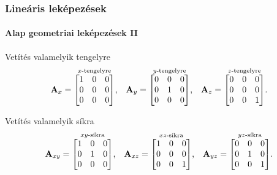\begin{frame}
  \frametitle{Lineáris leképezések}
  \framesubtitle{Alap geometriai leképezések II}

  \begin{block}{Vetítés valamelyik tengelyre}
    \[
      \mathbf{A}_x = \overset{x\text{-tengelyre}}{\begin{bmatrix}
          1 & 0 & 0 \\
          0 & 0 & 0 \\
          0 & 0 & 0
        \end{bmatrix}}
      \text,
      \quad
      \mathbf{A}_y = \overset{y\text{-tengelyre}}{\begin{bmatrix}
          0 & 0 & 0 \\
          0 & 1 & 0 \\
          0 & 0 & 0
        \end{bmatrix}}
      \text,
      \quad
      \mathbf{A}_z = \overset{z\text{-tengelyre}}{\begin{bmatrix}
          0 & 0 & 0 \\
          0 & 0 & 0 \\
          0 & 0 & 1
        \end{bmatrix}}
      \text.
    \]
  \end{block}

  \begin{block}{Vetítés valamelyik síkra}
    \[
      \mathbf{A}_{xy} = \overset{xy\text{-síkra}}{\begin{bmatrix}
          1 & 0 & 0 \\
          0 & 1 & 0 \\
          0 & 0 & 0
        \end{bmatrix}}
      \text,
      \quad
      \mathbf{A}_{xz} = \overset{xz\text{-síkra}}{\begin{bmatrix}
          1 & 0 & 0 \\
          0 & 0 & 0 \\
          0 & 0 & 1
        \end{bmatrix}}
      \text,
      \quad
      \mathbf{A}_{yz} = \overset{yz\text{-síkra}}{\begin{bmatrix}
          0 & 0 & 0 \\
          0 & 1 & 0 \\
          0 & 0 & 1
        \end{bmatrix}}
      \text.
    \]
  \end{block}
\end{frame}

